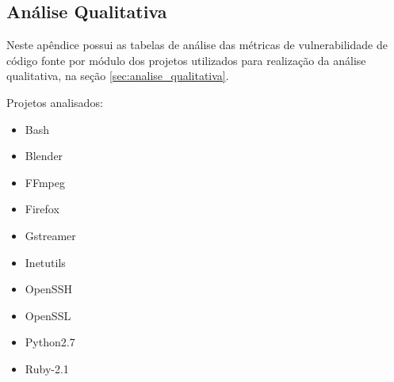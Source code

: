 \begin{apendicesenv}
\chapter{Análise Qualitativa} \label{anex:analise_qualitativa}

Neste apêndice possui as tabelas de análise das métricas de vulnerabilidade de código fonte por módulo
dos projetos utilizados para realização da análise qualitativa, na seção \ref{sec:analise_qualitativa}.

Projetos analisados:

\begin{multicols}{2}
\begin{itemize}
  \item Bash
  \item Blender
  \item FFmpeg
  \item Firefox
  \item Gstreamer
  \item Inetutils
  \item OpenSSH
  \item OpenSSL
  \item Python2.7
  \item Ruby-2.1
\end{itemize}
\end{multicols}

\begin{table}[h]
\caption{Projeto Bash}
\end{table}




\end{apendicesenv}
